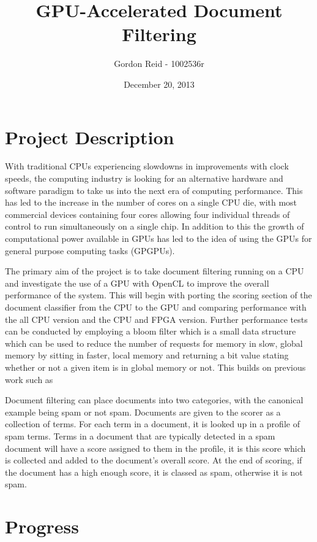 \documentclass[11pt]{article}
\begin{document}
\title{GPU-Accelerated Document Filtering}
\author{Gordon Reid - 1002536r}
\date{December 20, 2013}
\maketitle

\section*{Project Description}

With traditional CPUs experiencing slowdowns in improvements with clock speeds,
the computing industry is looking for an alternative hardware and software
paradigm to take us into the next era of computing performance. This has led to
the increase in the number of cores on a single CPU die, with most commercial
devices containing four cores allowing four individual threads of control to
run simultaneously on a single chip. In addition to this the growth of
computational power available in GPUs has led to the idea of using the GPUs for
general purpose computing tasks (GPGPUs).

The primary aim of the project is to take document filtering running on a CPU
and investigate the use of a GPU with OpenCL to improve the overall performance
of the system. This will begin with porting the scoring section of the document
classifier from the CPU to the GPU and comparing performance with the all CPU
version and the CPU and FPGA version. Further performance tests can be
conducted by employing a bloom filter which is a small data structure which can
be used to reduce the number of requests for memory in slow, global memory by
sitting in faster, local memory and returning a bit value stating whether or
not a given item is in global memory or not. This builds on previous work such
as \cite{wimPaper}

Document filtering can place documents into two categories, with the canonical
example being spam or not spam. Documents are given to the scorer as a
collection of terms. For each term in a document, it is looked up in a profile
of spam terms. Terms in a document that are typically detected in a spam
document will have a score assigned to them in the profile, it is this score
which is collected and added to the document's overall score. At the end of
scoring, if the document has a high enough score, it is classed as spam,
otherwise it is not spam.

\section*{Progress}
\end{document}
